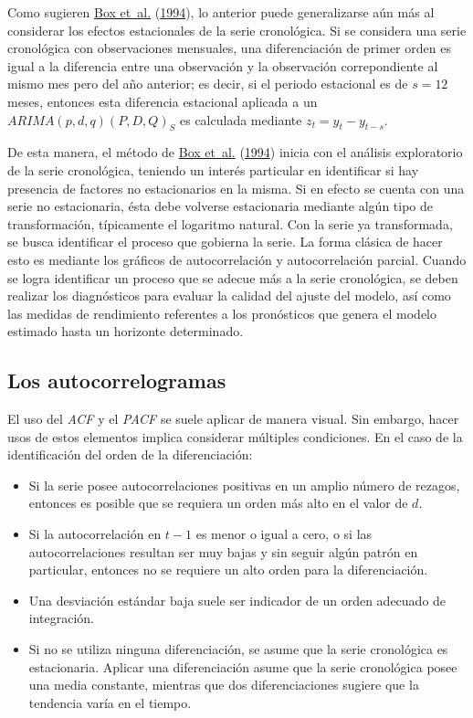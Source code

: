 \documentclass[
]{article}
\providecommand{\tightlist}{%
  \setlength{\itemsep}{0pt}\setlength{\parskip}{0pt}}
\begin{document}
Como sugieren \protect\hyperlink{ref-box-jenkins}{Box et~al.}
(\protect\hyperlink{ref-box-jenkins}{1994}), lo anterior puede
generalizarse aún más al considerar los efectos estacionales de la serie
cronológica. Si se considera una serie cronológica con observaciones
mensuales, una diferenciación de primer orden es igual a la diferencia
entre una observación y la observación correpondiente al mismo mes pero
del año anterior; es decir, si el periodo estacional es de \(s=12\)
meses, entonces esta diferencia estacional aplicada a un
\(ARIMA(p,d,q)(P,D,Q)_S\) es calculada mediante \(z_t=y_t-y_{t-s}\).

De esta manera, el método de \protect\hyperlink{ref-box-jenkins}{Box
et~al.} (\protect\hyperlink{ref-box-jenkins}{1994}) inicia con el
análisis exploratorio de la serie cronológica, teniendo un interés
particular en identificar si hay presencia de factores no estacionarios
en la misma. Si en efecto se cuenta con una serie no estacionaria, ésta
debe volverse estacionaria mediante algún tipo de transformación,
típicamente el logaritmo natural. Con la serie ya transformada, se busca
identificar el proceso que gobierna la serie. La forma clásica de hacer
esto es mediante los gráficos de autocorrelación y autocorrelación
parcial. Cuando se logra identificar un proceso que se adecue más a la
serie cronológica, se deben realizar los diagnósticos para evaluar la
calidad del ajuste del modelo, así como las medidas de rendimiento
referentes a los pronósticos que genera el modelo estimado hasta un
horizonte determinado.

\subsection{Los autocorrelogramas}

El uso del \emph{ACF} y el \emph{PACF} se suele aplicar de manera
visual. Sin embargo, hacer usos de estos elementos implica considerar
múltiples condiciones. En el caso de la identificación del orden de la
diferenciación:

\begin{itemize}
\tightlist
\item
  Si la serie posee autocorrelaciones positivas en un amplio número de
  rezagos, entonces es posible que se requiera un orden más alto en el
  valor de \(d\).
\item
  Si la autocorrelación en \(t-1\) es menor o igual a cero, o si las
  autocorrelaciones resultan ser muy bajas y sin seguir algún patrón en
  particular, entonces no se requiere un alto orden para la
  diferenciación.
\item
  Una desviación estándar baja suele ser indicador de un orden adecuado
  de integración.
\item
  Si no se utiliza ninguna diferenciación, se asume que la serie
  cronológica es estacionaria. Aplicar una diferenciación asume que la
  serie cronológica posee una media constante, mientras que dos
  diferenciaciones sugiere que la tendencia varía en el tiempo.
\end{itemize}
\end{document}
